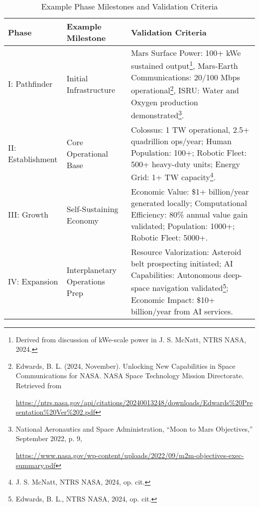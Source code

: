 \documentclass[fontsize=10pt, oneside, DIV=calc]{scrartcl}
\begin{document}
\begin{table}[htbp]
\centering
\caption{Example Phase Milestones and Validation Criteria}
\begin{tabularx}{\textwidth}{|X|X|X|}
\hline
\textbf{Phase} & \textbf{Example Milestone} & \textbf{Validation Criteria} \\ \hline
I: Pathfinder & Initial Infrastructure & Mars Surface Power: 100+ kWe sustained output\footnote{Derived from discussion of kWe-scale power in J. S. McNatt, NTRS NASA, 2024.}, Mars-Earth Communications: 20/100 Mbps operational\footnote{Edwards, B. L. (2024, November). Unlocking New Capabilities in Space Communications for NASA. NASA Space Technology Mission Directorate. Retrieved from 







\href{https://ntrs.nasa.gov/api/citations/20240013248/downloads/Edwards\%20Presentation\_Ver\%202.pdf}\url{https://ntrs.nasa.gov/api/citations/20240013248/downloads/Edwards\%20Presentation\%20Ver\%202.pdf}}, ISRU: Water and Oxygen production demonstrated\footnote{National Aeronautics and Space Administration, ``Moon to Mars Objectives,'' September 2022, p. 9, 







\href{https://www.nasa.gov/wp-content/uploads/2022/09/m2m-objectives-exec-summary.pdf}\url{https://www.nasa.gov/wp-content/uploads/2022/09/m2m-objectives-exec-summary.pdf}}. \\ \hline
II: Establishment & Core Operational Base & Colossus: 1 TW operational, 2.5+ quadrillion ops/year; Human Population: 100+; Robotic Fleet: 500+ heavy-duty units; Energy Grid: 1+ TW capacity\footnote{J. S. McNatt, NTRS NASA, 2024, op. cit.}. \\ \hline
III: Growth & Self-Sustaining Economy & Economic Value: \$1+ billion/year generated locally; Computational Efficiency: 80\% annual value gain validated; Population: 1000+; Robotic Fleet: 5000+. \\ \hline
IV: Expansion & Interplanetary Operations Prep & Resource Valorization: Asteroid belt prospecting initiated; AI Capabilities: Autonomous deep-space navigation validated\footnote{Edwards, B. L., NTRS NASA, 2024, op. cit.}; Economic Impact: \$10+ billion/year from AI services. \\ \hline
\end{tabularx}
\end{table}
\end{document}
